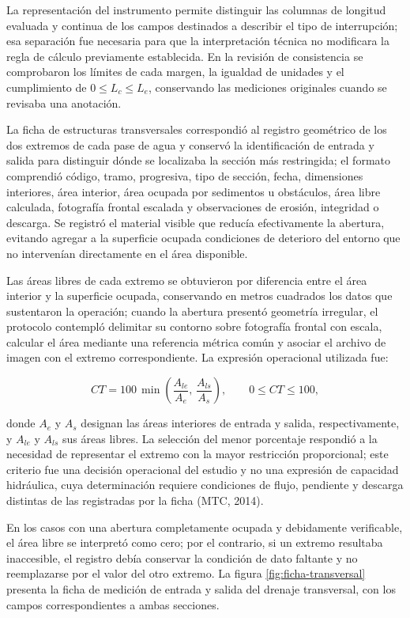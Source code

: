 La representación del instrumento permite distinguir las columnas de longitud evaluada y continua de los campos destinados a describir el tipo de interrupción; esa separación fue necesaria para que la interpretación técnica no modificara la regla de cálculo previamente establecida. En la revisión de consistencia se comprobaron los límites de cada margen, la igualdad de unidades y el cumplimiento de \(0\leq L_c\leq L_e\), conservando las mediciones originales cuando se revisaba una anotación.


La ficha de estructuras transversales correspondió al registro geométrico de los dos extremos de cada pase de agua y conservó la identificación de entrada y salida para distinguir dónde se localizaba la sección más restringida; el formato comprendió código, tramo, progresiva, tipo de sección, fecha, dimensiones interiores, área interior, área ocupada por sedimentos u obstáculos, área libre calculada, fotografía frontal escalada y observaciones de erosión, integridad o descarga. Se registró el material visible que reducía efectivamente la abertura, evitando agregar a la superficie ocupada condiciones de deterioro del entorno que no intervenían directamente en el área disponible.

Las áreas libres de cada extremo se obtuvieron por diferencia entre el área interior y la superficie ocupada, conservando en metros cuadrados los datos que sustentaron la operación; cuando la abertura presentó geometría irregular, el protocolo contempló delimitar su contorno sobre fotografía frontal con escala, calcular el área mediante una referencia métrica común y asociar el archivo de imagen con el extremo correspondiente. La expresión operacional utilizada fue:

\[
CT=100\,\min\left(\frac{A_{le}}{A_e},\,\frac{A_{ls}}{A_s}\right),
\qquad 0\leq CT\leq100,
\]

donde \(A_e\) y \(A_s\) designan las áreas interiores de entrada y salida, respectivamente, y \(A_{le}\) y \(A_{ls}\) sus áreas libres. La selección del menor porcentaje respondió a la necesidad de representar el extremo con la mayor restricción proporcional; este criterio fue una decisión operacional del estudio y no una expresión de capacidad hidráulica, cuya determinación requiere condiciones de flujo, pendiente y descarga distintas de las registradas por la ficha (MTC, 2014).

En los casos con una abertura completamente ocupada y debidamente verificable, el área libre se interpretó como cero; por el contrario, si un extremo resultaba inaccesible, el registro debía conservar la condición de dato faltante y no reemplazarse por el valor del otro extremo. La figura \ref{fig:ficha-transversal} presenta la ficha de medición de entrada y salida del drenaje transversal, con los campos correspondientes a ambas secciones.

